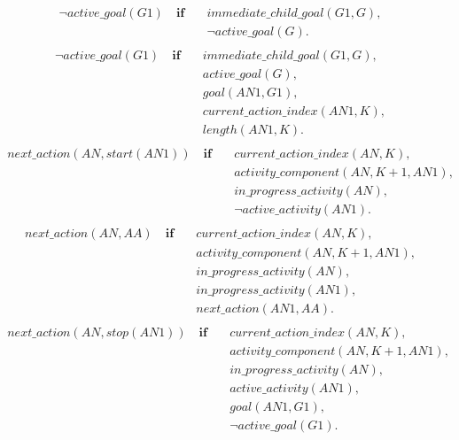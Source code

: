 \documentclass[11pt, oneside]{article}
\begin{document}
{\begin{align}
\begin{split}
\neg active\_goal(G1) \quad \mathbf{if}\quad & immediate\_child\_goal(G1, G), \\
&\neg active\_goal(G).
\end{split}\end{align}
\begin{align}\begin{split}
\neg active\_goal(G1) \quad \mathbf{if}\quad & immediate\_child\_goal(G1, G), \\
&active\_goal(G), \\
&goal(AN1, G1), \\
&current\_action\_index(AN1, K), \\
&length(AN1, K).
\end{split}\end{align}
\begin{align}\begin{split}
next\_action(AN, start(AN1)) \quad \mathbf{if}\quad & current\_action\_index(AN, K), \\
&activity\_component(AN, K+1, AN1), \\
&in\_progress\_activity(AN), \\
&\neg active\_activity(AN1).
\end{split}\end{align}
\begin{align}\begin{split}
next\_action(AN, AA) \quad \mathbf{if}\quad & current\_action\_index(AN, K), \\
&activity\_component(AN, K+1, AN1), \\
&in\_progress\_activity(AN), \\
&in\_progress\_activity(AN1), \\
&next\_action(AN1, AA).
\end{split}\end{align}
\begin{align}\begin{split}
next\_action(AN, stop(AN1)) \quad \mathbf{if}\quad & current\_action\_index(AN, K), \\
&activity\_component(AN, K+1, AN1), \\
&in\_progress\_activity(AN), \\
&active\_activity(AN1), \\
&goal(AN1, G1), \\
&\neg active\_goal(G1).
\end{split}\end{align}
}
\end{document}
